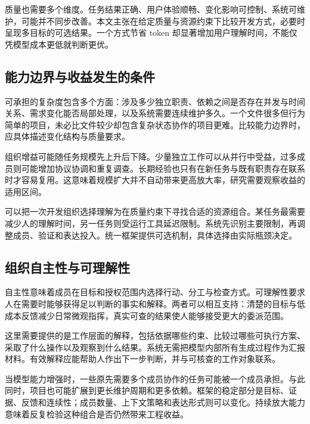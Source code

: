 质量也需要多个维度。任务结果正确、用户体验顺畅、变化影响可控制、系统可维护，可能并不同步改善。本文主张在给定质量与资源约束下比较开发方式，必要时呈现多目标的可选结果。一个方式节省 token 却显著增加用户理解时间，不能仅凭模型成本更低就判断更优。

\subsection{能力边界与收益发生的条件}
可承担的复杂度包含多个方面：涉及多少独立职责、依赖之间是否存在并发与时间关系、需求变化能否局部处理，以及系统需要连续维护多久。一个文件很多但行为简单的项目，未必比文件较少却包含复杂状态协作的项目更难。比较能力边界时，应具体描述变化结构与质量要求。

组织增益可能随任务规模先上升后下降。少量独立工作可以从并行中受益，过多成员则可能增加协议协调和重复调查。长期经验也只有在新任务与既有职责存在联系时才容易复用。这意味着规模扩大并不自动带来更高放大率，研究需要观察收益的适用区间。

可以把一次开发组织选择理解为在质量约束下寻找合适的资源组合。某任务最需要减少人的理解时间，另一任务则受运行工具延迟限制。系统先识别主要限制，再调整成员、验证和表达投入。统一框架提供可选机制，具体选择由实际瓶颈决定。

\subsection{组织自主性与可理解性}
自主性意味着成员在目标和授权范围内选择行动、分工与检查方式。可理解性要求人在需要时能够获得足以判断的事实和解释。两者可以相互支持：清楚的目标与低成本反馈减少日常微观指挥，真实可查的结果使人能够接受更大的委派范围。

这里需要提供的是工作层面的解释，包括依据哪些约束、比较过哪些可执行方案、采取了什么操作以及观察到什么结果。系统无需把模型内部所有生成过程作为汇报材料。有效解释应能帮助人作出下一步判断，并与可核查的工作对象联系。

当模型能力增强时，一些原先需要多个成员协作的任务可能被一个成员承担。与此同时，项目也可能扩展到更长维护周期和更多依赖。框架的稳定部分是目标、证据、反馈和连续性；成员数量、上下文策略和表达形式则可以变化。持续放大能力意味着反复检验这种组合是否仍然带来工程收益。
